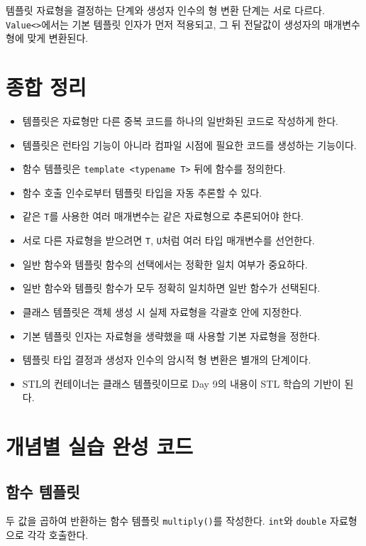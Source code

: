 \documentclass[11pt,a4paper]{article}
\begin{document}
\begin{importantbox}
템플릿 자료형을 결정하는 단계와 생성자 인수의 형 변환 단계는 서로 다르다. \texttt{Value<>}에서는 기본 템플릿 인자가 먼저 적용되고, 그 뒤 전달값이 생성자의 매개변수형에 맞게 변환된다.
\end{importantbox}

\section{종합 정리}
\begin{importantbox}
\begin{itemize}[leftmargin=1.5em]
    \item 템플릿은 자료형만 다른 중복 코드를 하나의 일반화된 코드로 작성하게 한다.
    \item 템플릿은 런타임 기능이 아니라 컴파일 시점에 필요한 코드를 생성하는 기능이다.
    \item 함수 템플릿은 \texttt{template <typename T>} 뒤에 함수를 정의한다.
    \item 함수 호출 인수로부터 템플릿 타입을 자동 추론할 수 있다.
    \item 같은 \texttt{T}를 사용한 여러 매개변수는 같은 자료형으로 추론되어야 한다.
    \item 서로 다른 자료형을 받으려면 \texttt{T}, \texttt{U}처럼 여러 타입 매개변수를 선언한다.
    \item 일반 함수와 템플릿 함수의 선택에서는 정확한 일치 여부가 중요하다.
    \item 일반 함수와 템플릿 함수가 모두 정확히 일치하면 일반 함수가 선택된다.
    \item 클래스 템플릿은 객체 생성 시 실제 자료형을 각괄호 안에 지정한다.
    \item 기본 템플릿 인자는 자료형을 생략했을 때 사용할 기본 자료형을 정한다.
    \item 템플릿 타입 결정과 생성자 인수의 암시적 형 변환은 별개의 단계이다.
    \item STL의 컨테이너는 클래스 템플릿이므로 Day 9의 내용이 STL 학습의 기반이 된다.
\end{itemize}
\end{importantbox}

\section{개념별 실습 완성 코드}
\subsection{함수 템플릿}
\begin{practicebox}
두 값을 곱하여 반환하는 함수 템플릿 \texttt{multiply()}를 작성한다. \texttt{int}와 \texttt{double} 자료형으로 각각 호출한다.
\end{practicebox}
\end{document}

